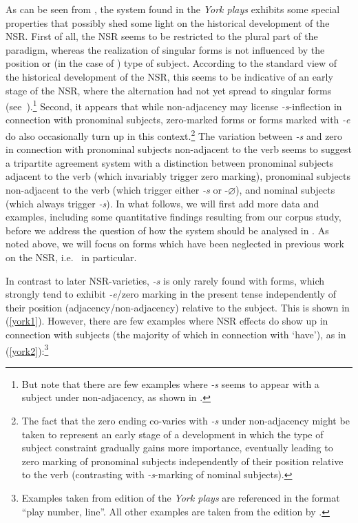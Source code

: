 \documentclass[output=paper]{langsci/langscibook}
\begin{document}
As can be seen from , the  system found in the \emph{York
plays} exhibits some special properties that possibly shed some light on the
historical development of the \gls{NSR}. First of all, the \gls{NSR} seems to
be restricted to the plural part of the paradigm, whereas the realization of
singular forms is not influenced by the position or (in the case of \Tsg{})
type of subject. According to the standard view of the historical development
of the \gls{NSR}, this seems to be indicative of an
early stage of the \gls{NSR}, where the  alternation had not yet
spread to singular forms (see~).\footnote{But note that there
    are few examples where \emph{-s} seems to appear with a \Fsg{} subject
    under non-adjacency, as shown in .} Second, it appears that while
    non-adjacency may license \emph{-s}-inflection in connection with
    pronominal subjects, zero-marked forms or forms marked with \emph{-e} do
    also occasionally turn up in this context.\footnote{The fact that the zero
        ending co-varies with \emph{-s} under non-adjacency might be taken to
        represent an early stage of a development in which the type of subject
        constraint gradually gains more importance, eventually leading to zero
    marking of pronominal subjects independently of their position relative to
the verb (contrasting with \emph{-s}-marking of nominal subjects).} The
variation between \emph{-s} and zero in connection with pronominal subjects
non-adjacent to the verb seems to suggest a tripartite agreement system with a
distinction between pronominal subjects adjacent to the verb (which invariably
trigger zero marking), pronominal subjects non-adjacent to the verb (which
trigger either \emph{-s} or -$\varnothing$), and nominal subjects (which always
trigger \emph{-s}). In what follows, we will first add more data and examples,
including some quantitative findings resulting from our corpus study, before we
address the question of how the  system should be analysed in
. As noted above, we will focus on forms which
have been neglected in previous work on the \gls{NSR}, i.e.\ \Ssg{} in particular.

In contrast to later \gls{NSR}-varieties, \emph{-s} is only rarely found with
\Fsg{} forms, which strongly tend to exhibit \emph{-e}/zero marking in the
present tense independently of their position (adjacency/non-adjacency)
relative to the subject. This is shown in (\ref{york1}). However, there are few
examples where \gls{NSR} effects do show up in
connection with \Fsg{} subjects (the majority of which in connection with
`have'), as in (\ref{york2}):\footnote{Examples taken from
     edition of the \emph{York plays} are referenced in
the format ``play number, line''. All other examples are taken from the edition
by \textcite{Beadle:1982}.}
\end{document}
